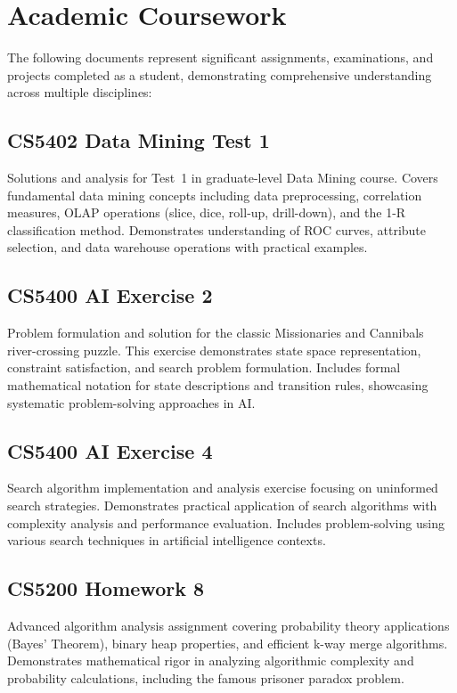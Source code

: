 \documentclass{mst}
\begin{document}
\section*{Academic Coursework}

The following documents represent significant assignments, examinations, and projects completed as a student, demonstrating comprehensive understanding across multiple disciplines:

\subsection*{CS5402 Data Mining Test 1}
Solutions and analysis for Test~1 in graduate-level Data Mining course. Covers fundamental data mining concepts including data preprocessing, correlation measures, OLAP operations (slice, dice, roll-up, drill-down), and the 1-R classification method. Demonstrates understanding of ROC curves, attribute selection, and data warehouse operations with practical examples.

\subsection*{CS5400 AI Exercise 2}
Problem formulation and solution for the classic Missionaries and Cannibals river-crossing puzzle. This exercise demonstrates state space representation, constraint satisfaction, and search problem formulation. Includes formal mathematical notation for state descriptions and transition rules, showcasing systematic problem-solving approaches in AI.

\subsection*{CS5400 AI Exercise 4}
Search algorithm implementation and analysis exercise focusing on uninformed search strategies. Demonstrates practical application of search algorithms with complexity analysis and performance evaluation. Includes problem-solving using various search techniques in artificial intelligence contexts.

\subsection*{CS5200 Homework 8}
Advanced algorithm analysis assignment covering probability theory applications (Bayes' Theorem), binary heap properties, and efficient k-way merge algorithms. Demonstrates mathematical rigor in analyzing algorithmic complexity and probability calculations, including the famous prisoner paradox problem.
\end{document}
